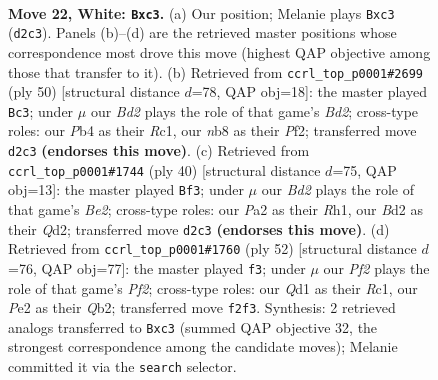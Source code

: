 \documentclass[11pt]{article}
\begin{document}
\clearpage

\begin{figure}[p]\centering
\begin{subfigure}{0.46\textwidth}\centering
\resizebox{\linewidth}{!}{%
\newchessgame
\chessboard[
  setfen={rn2k1r1/p7/b5p1/3q1p2/1P5P/2p5/P2BPP2/R2Q1RK1 w q - 0 22},
  showmover=false,
  pgfstyle=straightmove, color=movearrow, markmove={d2-c3}
]}
\caption{}
\end{subfigure}\hfill
\begin{subfigure}{0.46\textwidth}\centering
\resizebox{\linewidth}{!}{%
\newchessgame
\chessboard[
  setfen={r2r2k1/4bppp/4p3/4q3/1P6/6PP/3BPP2/2RQ1RK1 w - - 0 26},
  showmover=false,
  pgfstyle=straightmove, color=movearrow, markmove={d2-c3}
]}
\caption{}
\end{subfigure}
\\[4pt]
\begin{subfigure}{0.46\textwidth}\centering
\resizebox{\linewidth}{!}{%
\newchessgame
\chessboard[
  setfen={4r1k1/pp1n1r2/3p4/2p5/2P5/2P1q3/P2QB1P1/2KR3R w - - 0 21},
  showmover=false,
  pgfstyle=straightmove, color=movearrow, markmove={e2-f3}
]}
\caption{}
\end{subfigure}\hfill
\begin{subfigure}{0.46\textwidth}\centering
\resizebox{\linewidth}{!}{%
\newchessgame
\chessboard[
  setfen={r1b1r1k1/p4pp1/2q4p/2P1B3/3p3P/P2P2P1/1Q3P2/2R1R1K1 w - - 1 27},
  showmover=false,
  pgfstyle=straightmove, color=movearrow, markmove={f2-f3}
]}
\caption{}
\end{subfigure}
\caption{\textbf{Move 22, White: \texttt{Bxc3}.} (a) Our position; Melanie plays \texttt{Bxc3} (\texttt{d2c3}). Panels (b)--(d) are the retrieved master positions whose correspondence most drove this move (highest QAP objective among those that transfer to it). (b) Retrieved from \texttt{ccrl\_top\_p0001\#2699} (ply 50) [structural distance $d$=78, QAP obj=18]: the master played \texttt{Bc3}; under $\mu$ our \emph{Bd2} plays the role of that game's \emph{Bd2}; cross-type roles: our \emph{P}b4 as their \emph{R}c1, our \emph{n}b8 as their \emph{P}f2; transferred move \texttt{d2c3} \textbf{(endorses this move)}. (c) Retrieved from \texttt{ccrl\_top\_p0001\#1744} (ply 40) [structural distance $d$=75, QAP obj=13]: the master played \texttt{Bf3}; under $\mu$ our \emph{Bd2} plays the role of that game's \emph{Be2}; cross-type roles: our \emph{P}a2 as their \emph{R}h1, our \emph{B}d2 as their \emph{Q}d2; transferred move \texttt{d2c3} \textbf{(endorses this move)}. (d) Retrieved from \texttt{ccrl\_top\_p0001\#1760} (ply 52) [structural distance $d$=76, QAP obj=77]: the master played \texttt{f3}; under $\mu$ our \emph{Pf2} plays the role of that game's \emph{Pf2}; cross-type roles: our \emph{Q}d1 as their \emph{R}c1, our \emph{P}e2 as their \emph{Q}b2; transferred move \texttt{f2f3}. Synthesis: 2 retrieved analogs transferred to \texttt{Bxc3} (summed QAP objective 32, the strongest correspondence among the candidate moves); Melanie committed it via the \texttt{search} selector.}
\label{fig:thought-m42}
\end{figure}
\end{document}
